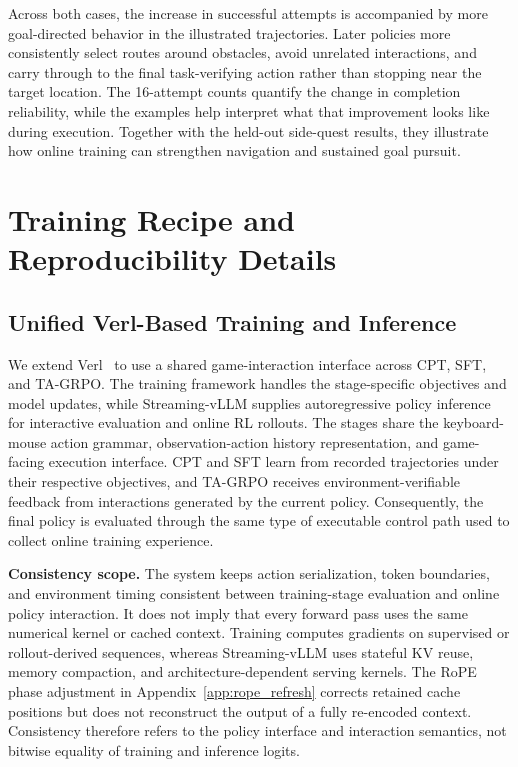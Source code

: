 Across both cases, the increase in successful attempts is accompanied by more goal-directed behavior in the illustrated trajectories. Later policies more consistently select routes around obstacles, avoid unrelated interactions, and carry through to the final task-verifying action rather than stopping near the target location. The 16-attempt counts quantify the change in completion reliability, while the examples help interpret what that improvement looks like during execution. Together with the held-out side-quest results, they illustrate how online training can strengthen navigation and sustained goal pursuit.

\FloatBarrier

\section{Training Recipe and Reproducibility Details}
\label{app:training_recipe_details}

\subsection{Unified Verl-Based Training and Inference}
\label{app:unified_training_inference}

We extend Verl~\cite{sheng2024hybridflow} to use a shared game-interaction interface across CPT, SFT, and TA-GRPO. The training framework handles the stage-specific objectives and model updates, while Streaming-vLLM supplies autoregressive policy inference for interactive evaluation and online RL rollouts. The stages share the keyboard-mouse action grammar, observation-action history representation, and game-facing execution interface. CPT and SFT learn from recorded trajectories under their respective objectives, and TA-GRPO receives environment-verifiable feedback from interactions generated by the current policy. Consequently, the final policy is evaluated through the same type of executable control path used to collect online training experience.

\textbf{Consistency scope.} The system keeps action serialization, token boundaries, and environment timing consistent between training-stage evaluation and online policy interaction. It does not imply that every forward pass uses the same numerical kernel or cached context. Training computes gradients on supervised or rollout-derived sequences, whereas Streaming-vLLM uses stateful KV reuse, memory compaction, and architecture-dependent serving kernels. The RoPE phase adjustment in Appendix~\ref{app:rope_refresh} corrects retained cache positions but does not reconstruct the output of a fully re-encoded context. Consistency therefore refers to the policy interface and interaction semantics, not bitwise equality of training and inference logits.

